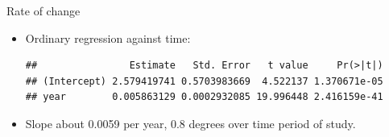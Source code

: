 \begin{frame}[fragile]{Rate of change}

  \begin{itemize}
  \item Ordinary regression against time:
{\small
\begin{knitrout}
\color{fgcolor}\begin{kframe}
\begin{alltt}
\hlkwb{=}\hlopt{~}
\hlopt{$}
\end{alltt}
\begin{verbatim}
##                Estimate   Std. Error   t value     Pr(>|t|)
## (Intercept) 2.579419741 0.5703983669  4.522137 1.370671e-05
## year        0.005863129 0.0002932085 19.996448 2.416159e-41
\end{verbatim}
\end{kframe}
\end{knitrout}
}
\item Slope about 0.0059 per year, 0.8
  degrees over 
  time period of study.
  \end{itemize}
  
\end{frame}

